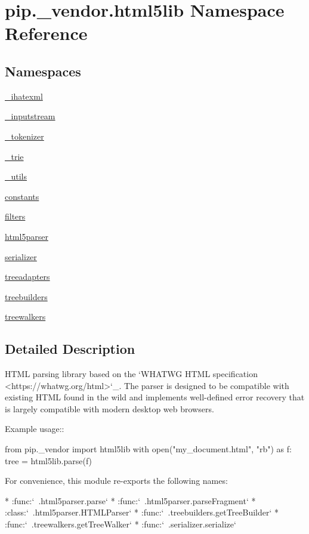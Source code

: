 \hypertarget{namespacepip_1_1__vendor_1_1html5lib}{}\section{pip.\+\_\+vendor.\+html5lib Namespace Reference}
\label{namespacepip_1_1__vendor_1_1html5lib}
\subsection*{Namespaces}
\begin{DoxyCompactItemize}
\item 
 \hyperlink{namespacepip_1_1__vendor_1_1html5lib_1_1__ihatexml}{\+\_\+ihatexml}
\item 
 \hyperlink{namespacepip_1_1__vendor_1_1html5lib_1_1__inputstream}{\+\_\+inputstream}
\item 
 \hyperlink{namespacepip_1_1__vendor_1_1html5lib_1_1__tokenizer}{\+\_\+tokenizer}
\item 
 \hyperlink{namespacepip_1_1__vendor_1_1html5lib_1_1__trie}{\+\_\+trie}
\item 
 \hyperlink{namespacepip_1_1__vendor_1_1html5lib_1_1__utils}{\+\_\+utils}
\item 
 \hyperlink{namespacepip_1_1__vendor_1_1html5lib_1_1constants}{constants}
\item 
 \hyperlink{namespacepip_1_1__vendor_1_1html5lib_1_1filters}{filters}
\item 
 \hyperlink{namespacepip_1_1__vendor_1_1html5lib_1_1html5parser}{html5parser}
\item 
 \hyperlink{namespacepip_1_1__vendor_1_1html5lib_1_1serializer}{serializer}
\item 
 \hyperlink{namespacepip_1_1__vendor_1_1html5lib_1_1treeadapters}{treeadapters}
\item 
 \hyperlink{namespacepip_1_1__vendor_1_1html5lib_1_1treebuilders}{treebuilders}
\item 
 \hyperlink{namespacepip_1_1__vendor_1_1html5lib_1_1treewalkers}{treewalkers}
\end{DoxyCompactItemize}


\subsection{Detailed Description}
\begin{DoxyVerb}HTML parsing library based on the `WHATWG HTML specification
<https://whatwg.org/html>`_. The parser is designed to be compatible with
existing HTML found in the wild and implements well-defined error recovery that
is largely compatible with modern desktop web browsers.

Example usage::

    from pip._vendor import html5lib
    with open("my_document.html", "rb") as f:
        tree = html5lib.parse(f)

For convenience, this module re-exports the following names:

* :func:`~.html5parser.parse`
* :func:`~.html5parser.parseFragment`
* :class:`~.html5parser.HTMLParser`
* :func:`~.treebuilders.getTreeBuilder`
* :func:`~.treewalkers.getTreeWalker`
* :func:`~.serializer.serialize`
\end{DoxyVerb}
 
